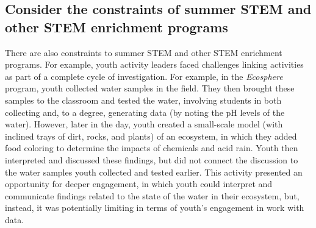 \documentclass[]{msu-thesis}
\theoremstyle{definition}
\theoremstyle{definition}
\theoremstyle{definition}
\theoremstyle{remark}
\begin{document}
\subsection{Consider the constraints of summer STEM and other STEM
enrichment
programs}\label{consider-the-constraints-of-summer-stem-and-other-stem-enrichment-programs}

There are also constraints to summer STEM and other STEM enrichment
programs. For example, youth activity leaders faced challenges linking
activities as part of a complete cycle of investigation. For example, in
the \emph{Ecosphere} program, youth collected water samples in the
field. They then brought these samples to the classroom and tested the
water, involving students in both collecting and, to a degree,
generating data (by noting the pH levels of the water). However, later
in the day, youth created a small-scale model (with inclined trays of
dirt, rocks, and plants) of an ecosystem, in which they added food
coloring to determine the impacts of chemicals and acid rain. Youth then
interpreted and discussed these findings, but did not connect the
discussion to the water samples youth collected and tested earlier. This
activity presented an opportunity for deeper engagement, in which youth
could interpret and communicate findings related to the state of the
water in their ecosystem, but, instead, it was potentially limiting in
terms of youth's engagement in work with data.
\end{document}
